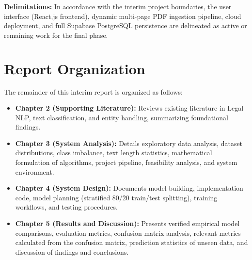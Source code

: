 \textbf{Delimitations:} In accordance with the interim project boundaries, the user interface (React.js frontend), dynamic multi-page PDF ingestion pipeline, cloud deployment, and full Supabase PostgreSQL persistence are delineated as active or remaining work for the final phase.

\section*{Report Organization}
\label{sec:report_organization}
The remainder of this interim report is organized as follows:
\begin{itemize}
    \item \textbf{Chapter 2 (Supporting Literature):} Reviews existing literature in Legal NLP, text classification, and entity handling, summarizing foundational findings.
    \item \textbf{Chapter 3 (System Analysis):} Details exploratory data analysis, dataset distributions, class imbalance, text length statistics, mathematical formulation of algorithms, project pipeline, feasibility analysis, and system environment.
    \item \textbf{Chapter 4 (System Design):} Documents model building, implementation code, model planning (stratified 80/20 train/test splitting), training workflows, and testing procedures.
    \item \textbf{Chapter 5 (Results and Discussion):} Presents verified empirical model comparisons, evaluation metrics, confusion matrix analysis, relevant metrics calculated from the confusion matrix, prediction statistics of unseen data, and discussion of findings and conclusions.
\end{itemize}
